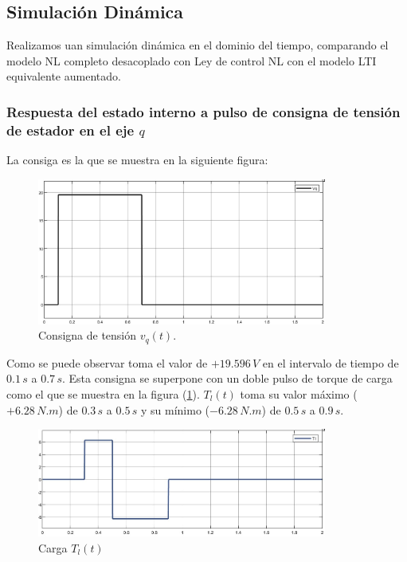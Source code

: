 \documentclass{article}
\begin{document}

\subsection{Simulación Dinámica}

Realizamos uan simulación dinámica en el dominio del tiempo, comparando el modelo NL completo 
desacoplado con Ley de control NL con el modelo LTI equivalente aumentado.

\subsubsection{Respuesta del estado interno a pulso de consigna de tensión de estador en el eje $q$}

La consiga es la que se muestra en la siguiente figura:

\begin{figure}[H]
    \centering
    \includegraphics[width=0.85\textwidth]{5.1.6_consigna.jpg}
    \caption{Consigna de tensión $v_q(t)$.}
\end{figure}

Como se puede observar toma el valor de $+19.596 \, V$ en el intervalo de tiempo de $0.1 \, s$ a $0.7 \, s$.
Esta consigna se superpone con un doble pulso de torque de carga como el que se muestra en la figura (\ref{fig:torque_carga}).
$T_l(t)$ toma su  valor máximo ($+6.28 \, N.m$) de $0.3 \, s$ a $0.5 \, s$ y su mínimo ($-6.28 \, N.m$) de $0.5 \, s$ a $0.9 \, s$.

\begin{figure}[H]
    \centering
    \includegraphics[width=0.85\textwidth]{5.1.6_carga2.jpg}
    \caption{Carga $T_l(t)$}
    \label{fig:torque_carga}
\end{figure}
\end{document}
